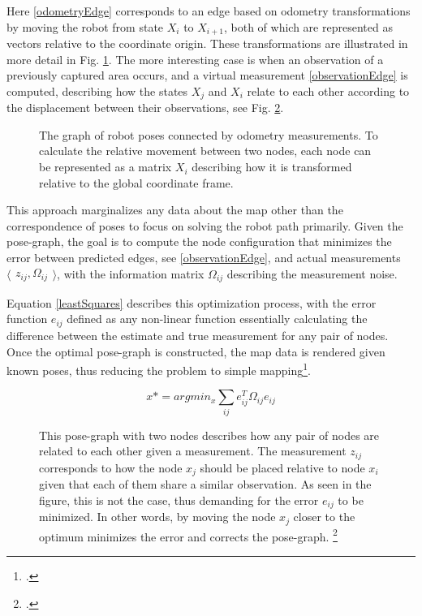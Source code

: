 Here \ref{odometryEdge} corresponds to an edge based on odometry transformations by moving the robot from state $X_{i}$ to $X_{i+1}$, both of which are represented as vectors relative to the coordinate origin.
These transformations are illustrated in more detail in Fig. \ref{fig:poseGraphTransformation}.
The more interesting case is when an observation of a previously captured area occurs, and a virtual measurement \ref{observationEdge} is computed, describing how the states $X_{j}$ and $X_{i}$ relate to each other according to the displacement between their observations, see Fig. \ref{fig:poseGraphOptimization}.

\begin{figure}
	\centering
	
	\caption{
		The graph of robot poses connected by odometry measurements. To calculate the relative movement between two nodes, each node can be represented as a matrix $X_{i}$ describing how it is transformed relative to the global coordinate frame.
	}
	\label{fig:poseGraphTransformation}
\end{figure}



This approach marginalizes any data about the map other than the correspondence of poses to focus on solving the robot path primarily. 
Given the pose-graph, the goal is to compute the node configuration that minimizes the error between predicted edges, see \ref{observationEdge}, and actual measurements  
$
\langle
\begin{matrix}
	z_{ij},  \Omega_{ij}
\end{matrix}
\rangle
$, with the information matrix $\Omega_{ij}$ describing the measurement noise.

Equation \ref{leastSquares} describes this optimization process, with the error function $e_{ij}$ defined as any non-linear function essentially calculating the difference between the estimate and true measurement for any pair of nodes. 
Once the optimal pose-graph is constructed, the map data is rendered given known poses, thus reducing the problem to simple mapping\footcite{grisetti2010graphSLAM}.

\begin{equation}\label{leastSquares}
	x* = argmin_{x} \sum_{ij}e_{ij}^{T} \Omega_{ij} e_{ij}
\end{equation}


\begin{figure}
	\centering
	
	\caption{
		This pose-graph with two nodes describes how any pair of nodes are related to each other given a measurement. The measurement $ z_{ij} $ corresponds to how the node $x_{j}$ should be placed relative to node $x_{i}$ given that each of them share a similar observation. As seen in the figure, this is not the case, thus demanding for the error $e_{ij}$ to be minimized. In other words, by moving the node $x_{j}$ closer to the optimum minimizes the error and corrects the pose-graph. \footcite{grisetti2010graphSLAM}
	}
	\label{fig:poseGraphOptimization}
\end{figure}



